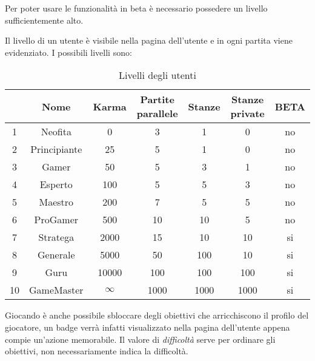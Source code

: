 Per poter usare le funzionalità in beta è necessario possedere un livello sufficientemente alto.

Il livello di un utente è visibile nella pagina dell'utente e in ogni partita viene evidenziato. I possibili livelli sono:

\begin{table}
	\begin{tabular}{|c|c|c|c|c|c|c|}
		\hline
		& \textbf{Nome} & \textbf{Karma} & \textbf{Partite parallele} & \textbf{Stanze} & \textbf{Stanze private} & \textbf{BETA} \\
		\hline
		1 & Neofita 	 & 0    &   3 &   1 &   0 & no \\
		2 & Principiante & 25   &   5 &   1 &   0 & no \\
		3 & Gamer        & 50   &   5 &   3 &   1 & no \\
		4 & Esperto      & 100  &   5 &   5 &   3 & no \\
		5 & Maestro      & 200  &   7 &   5 &   5 & no \\
		6 & ProGamer     & 500  &  10 &  10 &   5 & no \\
		7 & Stratega     & 2000 &  15 &  10 &  10 & si \\
		8 & Generale     & 5000 &  50 & 100 &  10 & si \\
		9 & Guru         & 10000& 100 & 100 & 100 & si \\
		10 & GameMaster   & $\infty$ & 1000 & 1000 & 1000 & si \\
		\hline
	\end{tabular}
	\caption{Livelli degli utenti}
	\label{tab:livelli}
\end{table}

Giocando è anche possibile sbloccare degli obiettivi che arricchiscono il profilo del giocatore, un badge verrà infatti visualizzato nella pagina dell'utente appena compie un'azione memorabile. Il valore di \emph{difficoltà} serve per ordinare gli obiettivi, non necessariamente indica la difficoltà.

